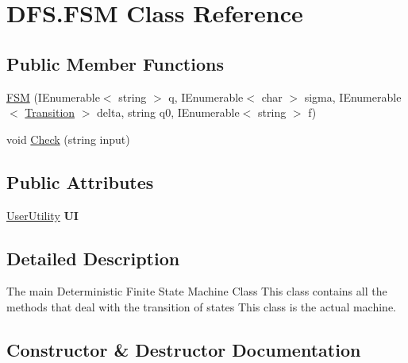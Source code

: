\hypertarget{class_d_f_s_1_1_f_s_m}{}\section{D\+F\+S.\+F\+S\+M Class Reference}
\label{class_d_f_s_1_1_f_s_m}
\subsection*{Public Member Functions}
\begin{DoxyCompactItemize}
\item 
\hyperlink{class_d_f_s_1_1_f_s_m_aed689c37db32878630ae34297a8a5329}{F\+S\+M} (I\+Enumerable$<$ string $>$ q, I\+Enumerable$<$ char $>$ sigma, I\+Enumerable$<$ \hyperlink{class_d_f_s_1_1_transition}{Transition} $>$ delta, string q0, I\+Enumerable$<$ string $>$ f)
\item 
void \hyperlink{class_d_f_s_1_1_f_s_m_abbe483d3569b781d4813cb79574e1955}{Check} (string input)
\end{DoxyCompactItemize}
\subsection*{Public Attributes}
\begin{DoxyCompactItemize}
\item 
\hypertarget{class_d_f_s_1_1_f_s_m_a8700562e84bbf586a4eedbd828482307}{}\hyperlink{class_d_f_s_1_1_user_utility}{User\+Utility} {\bfseries U\+I}\label{class_d_f_s_1_1_f_s_m_a8700562e84bbf586a4eedbd828482307}

\end{DoxyCompactItemize}


\subsection{Detailed Description}
The main Deterministic Finite State Machine Class This class contains all the methods that deal with the transition of states This class is the actual machine. 

\subsection{Constructor \& Destructor Documentation}
\hypertarget{class_d_f_s_1_1_f_s_m_aed689c37db32878630ae34297a8a5329}{}
